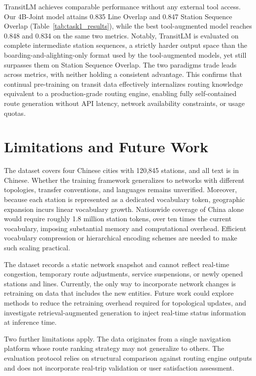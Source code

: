 \documentclass{llmxive}
\begin{document}
TransitLM achieves comparable performance without any external tool access. Our 4B-Joint model attains 0.835 Line Overlap and 0.847 Station Sequence Overlap (Table~\ref{tab:task1_results}), while the best tool-augmented model reaches 0.848 and 0.834 on the same two metrics. Notably, TransitLM is evaluated on complete intermediate station sequences, a strictly harder output space than the boarding-and-alighting-only format used by the tool-augmented models, yet still surpasses them on Station Sequence Overlap. The two paradigms trade leads across metrics, with neither holding a consistent advantage. This confirms that continual pre-training on transit data effectively internalizes routing knowledge equivalent to a production-grade routing engine, enabling fully self-contained route generation without API latency, network availability constraints, or usage quotas.

\section{Limitations and Future Work}
\label{app:limitations}

The dataset covers four Chinese cities with 120,845 stations, and all text is in Chinese. Whether the training framework generalizes to networks with different topologies, transfer conventions, and languages remains unverified. Moreover, because each station is represented as a dedicated vocabulary token, geographic expansion incurs linear vocabulary growth. Nationwide coverage of China alone would require roughly 1.8 million station tokens, over ten times the current vocabulary, imposing substantial memory and computational overhead. Efficient vocabulary compression or hierarchical encoding schemes are needed to make such scaling practical.

The dataset records a static network snapshot and cannot reflect real-time congestion, temporary route adjustments, service suspensions, or newly opened stations and lines. Currently, the only way to incorporate network changes is retraining on data that includes the new entities. Future work could explore methods to reduce the retraining overhead required for topological updates, and investigate retrieval-augmented generation to inject real-time status information at inference time.

Two further limitations apply. The data originates from a single navigation platform whose route ranking strategy may not generalize to others. The evaluation protocol relies on structural comparison against routing engine outputs and does not incorporate real-trip validation or user satisfaction assessment.
\end{document}
